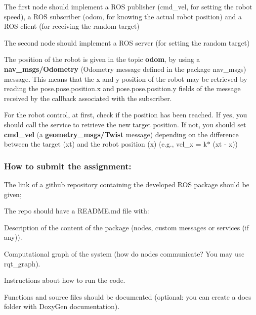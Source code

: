 \begin{DoxyItemize}
\item The first node should implement a R\+OS publisher (cmd\+\_\+vel, for setting the robot speed), a R\+OS subscriber (odom, for knowing the actual robot position) and a R\+OS client (for receiving the random target)
\item The second node should implement a R\+OS server (for setting the random target)
\item The position of the robot is given in the topic {\bfseries odom}, by using a {\bfseries nav\+\_\+msgs/\+Odometry} (Odometry message defined in the package nav\+\_\+msgs) message. This means that the x and y position of the robot may be retrieved by reading the pose.\+pose.\+position.\+x and pose.\+pose.\+position.\+y fields of the message received by the callback associated with the subscriber.
\item For the robot control, at first, check if the position has been reached. If yes, you should call the service to retrieve the new target position. If not, you should set {\bfseries cmd\+\_\+vel} (a {\bfseries geometry\+\_\+msgs/\+Twist} message) depending on the difference between the target (xt) and the robot position (x) (e.\+g., vel\+\_\+x = k$\ast$ (xt -\/ x))
\end{DoxyItemize}

\subsubsection*{How to submit the assignment\+:}


\begin{DoxyItemize}
\item The link of a github repository containing the developed R\+OS package should be given;
\item The repo should have a R\+E\+A\+D\+M\+E.\+md file with\+:
\begin{DoxyItemize}
\item Description of the content of the package (nodes, custom messages or services (if any)).
\item Computational graph of the system (how do nodes communicate? You may use rqt\+\_\+graph).
\item Instructions about how to run the code.
\end{DoxyItemize}
\item Functions and source files should be documented (optional\+: you can create a docs folder with Doxy\+Gen documentation).
\end{DoxyItemize}


